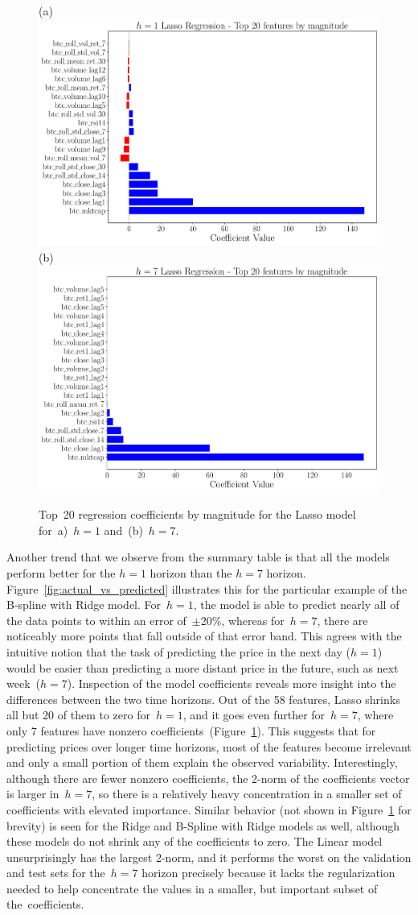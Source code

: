 \documentclass{article}
\begin{document}
\begin{figure}[ht]
    \centering
    (a)\includegraphics[width=0.45\linewidth]{figures/h1_lasso_coefs.pdf}
    (b)\includegraphics[width=0.45\linewidth]{figures/h7_lasso_coefs.pdf}
    \caption{Top~20 regression coefficients by magnitude for the Lasso model for~a)~$h=1$ and~(b)~$h=7$.}
    \label{fig:lasso_coefficients}
\end{figure}

Another trend that we observe from the summary table is that all the models perform better for the $h=1$ horizon than the $h=7$ horizon. Figure~\ref{fig:actual_vs_predicted} illustrates this for the particular example of the B-spline with Ridge model. For~$h=1$, the model is able to predict nearly all of the data points to within an error of~$\pm$20\%, whereas for~$h=7$, there are noticeably more points that fall outside of that error band. This agrees with the intuitive notion that the task of predicting the price in the next day ($h=1$) would be easier than predicting a more distant price in the future, such as next week~($h=7$). Inspection of the model coefficients reveals more insight into the differences between the two time horizons. Out of the 58 features, Lasso shrinks all but 20 of them to zero for~$h=1$, and it goes even further for~$h=7$, where only 7 features have nonzero coefficients~(Figure~\ref{fig:lasso_coefficients}). This suggests that for predicting prices over longer time horizons, most of the features become irrelevant and only a small portion of them explain the observed variability. Interestingly, although there are fewer nonzero coefficients, the 2-norm of the coefficients vector is larger in~$h=7$, so there is a relatively heavy concentration in a smaller set of coefficients with elevated importance. Similar behavior (not shown in Figure~\ref{fig:lasso_coefficients} for brevity) is seen for the Ridge and B-Spline with Ridge models as well, although these models do not shrink any of the coefficients to zero. The Linear model unsurprisingly has the largest 2-norm, and it performs the worst on the validation and test sets for the~$h=7$ horizon precisely because it lacks the regularization needed to help concentrate the values in a smaller, but important subset of the~coefficients.
\end{document}
